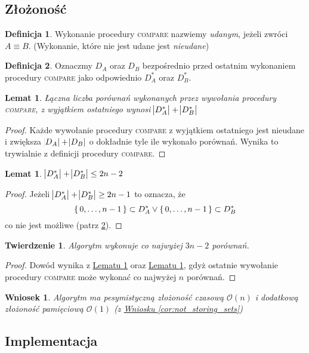 \documentclass{scrartcl}
\theoremstyle{definition}
\theoremstyle{plain}
\theoremstyle{remark}
\theoremstyle{plain}
\theoremstyle{definition}
\newtheorem{def_success_compare}{Definicja}[section]
\newtheorem{def_D_star}[def_success_compare]{Definicja}
\theoremstyle{plain}
\newtheorem{lemma_unsuccesful_comparisons}
[lemma_equiv_if_lex_min_eq]{Lemat}
\newtheorem{lemma_d_star_len}[lemma_equiv_if_lex_min_eq]{Lemat}
\newtheorem{complexity_theorem}[termination_theorem]{Twierdzenie}
\newtheorem{o_complexity}[not_storing_sets]{Wniosek}
\begin{document}
\subsection{Złożoność}
\begin{def_success_compare}
	\label{def:success_compare}
	Wykonanie procedury \textnormal{\textsc{compare}}
	nazwiemy \emph{udanym}, jeżeli zwróci \(A\equiv B\).
	(Wykonanie, które nie jest udane jest \emph{nieudane})
\end{def_success_compare}
\begin{def_D_star}
	\label{def:D_star}
	Oznaczmy \(D_A\) oraz \(D_B\)
	bezpośrednio przed ostatnim wykonaniem
	procedury \textnormal{\textsc{compare}}
	jako odpowiednio \(D_A^*\) oraz \(D_B^*\).
\end{def_D_star}
\begin{lemma_unsuccesful_comparisons}
	\label{lem:unsuccesful_comparisons}
	Łączna liczba porównań wykonanych przez
	wywołania procedury \textnormal{\textsc{compare}},
	z wyjątkiem ostatniego wynosi
	\(\abs{D_A^*}+\abs{D_B^*}\)
\end{lemma_unsuccesful_comparisons}
\begin{proof}
	Każde wywołanie procedury \textsc{compare}
	z wyjątkiem ostatniego jest nieudane
	i zwiększa \(\abs{D_A}+\abs{D_B}\)
	o dokładnie tyle ile wykonało porównań.
	Wynika to trywialnie z definicji
	procedury \textsc{compare}.
\end{proof}
\begin{lemma_d_star_len}
	\label{lem:d_star_len}
	\(\abs{D_A^*}+\abs{D_B^*}\leq2n-2\)
\end{lemma_d_star_len}
\begin{proof}
	Jeżeli \(\abs{D_A^*}+\abs{D_B^*}\ge2n-1\)
	to oznacza, że
	\[\set{0,\dots,n-1}\subset D_A^* \lor
		\set{0,\dots,n-1}\subset D_B^*\]
	co nie jest możliwe (patrz \cref{def:D_star}).
\end{proof}
\begin{complexity_theorem}
	Algorytm wykonuje co najwyżej \(3n-2\) porównań.
\end{complexity_theorem}
\begin{proof}
	Dowód wynika z
	\hyperref[lem:unsuccesful_comparisons]
	{Lematu \ref*{lem:unsuccesful_comparisons}}
	oraz
	\hyperref[lem:d_star_len]{Lematu \ref*{lem:d_star_len}},
	gdyż ostatnie wywołanie procedury \textsc{compare}
	może wykonać co najwyżej \(n\) porównań.
\end{proof}
\begin{o_complexity}
	Algorytm ma pesymistyczną złożoność czasową \(\mathcal{O}(n)\)
	i dodatkową złożoność pamięciową \(\mathcal{O}(1)\)
	(z \hyperref[cor:not_storing_sets]
	{Wniosku \ref*{cor:not_storing_sets}})
\end{o_complexity}
\pagebreak
\subsection{Implementacja}
\inputminted{python3}{../implementacje/fast.py}
\pagebreak
\printbibliography[heading=bibintoc]
\end{document}
